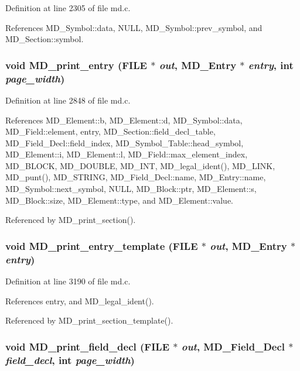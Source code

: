 Definition at line 2305 of file md.c.

References MD\_\-Symbol::data, NULL, MD\_\-Symbol::prev\_\-symbol, and MD\_\-Section::symbol.
\subsubsection{\setlength{\rightskip}{0pt plus 5cm}void MD\_\-print\_\-entry (FILE $\ast$ {\em out}, \bf{MD\_\-Entry} $\ast$ {\em entry}, int {\em page\_\-width})}\label{md_8c_abcdd59628e0ae0a22502255751bdc72}




Definition at line 2848 of file md.c.

References MD\_\-Element::b, MD\_\-Element::d, MD\_\-Symbol::data, MD\_\-Field::element, entry, MD\_\-Section::field\_\-decl\_\-table, MD\_\-Field\_\-Decl::field\_\-index, MD\_\-Symbol\_\-Table::head\_\-symbol, MD\_\-Element::i, MD\_\-Element::l, MD\_\-Field::max\_\-element\_\-index, MD\_\-BLOCK, MD\_\-DOUBLE, MD\_\-INT, MD\_\-legal\_\-ident(), MD\_\-LINK, MD\_\-punt(), MD\_\-STRING, MD\_\-Field\_\-Decl::name, MD\_\-Entry::name, MD\_\-Symbol::next\_\-symbol, NULL, MD\_\-Block::ptr, MD\_\-Element::s, MD\_\-Block::size, MD\_\-Element::type, and MD\_\-Element::value.

Referenced by MD\_\-print\_\-section().
\subsubsection{\setlength{\rightskip}{0pt plus 5cm}void MD\_\-print\_\-entry\_\-template (FILE $\ast$ {\em out}, \bf{MD\_\-Entry} $\ast$ {\em entry})}\label{md_8c_fa54d4b65e66f3155ce7a585a76e7244}




Definition at line 3190 of file md.c.

References entry, and MD\_\-legal\_\-ident().

Referenced by MD\_\-print\_\-section\_\-template().
\subsubsection{\setlength{\rightskip}{0pt plus 5cm}void MD\_\-print\_\-field\_\-decl (FILE $\ast$ {\em out}, \bf{MD\_\-Field\_\-Decl} $\ast$ {\em field\_\-decl}, int {\em page\_\-width})}\label{md_8c_da54c72928268acad4526ab846aa837d}




